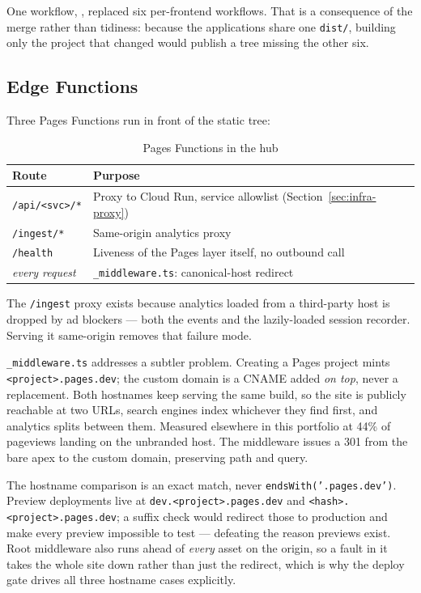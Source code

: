 One workflow, , replaced six per-frontend workflows.
That is a consequence of the merge rather than tidiness: because the applications
share one \texttt{dist/}, building only the project that changed would publish a
tree missing the other six.

\subsection{Edge Functions}

Three Pages Functions run in front of the static tree:

\begin{table}[h]
\centering
\caption{Pages Functions in the hub}
\label{tab:hub-functions}
\begin{tabular}{ll}
\toprule
\textbf{Route} & \textbf{Purpose} \\
\midrule
\texttt{/api/<svc>/*} & Proxy to Cloud Run, service allowlist (Section~\ref{sec:infra-proxy}) \\
\texttt{/ingest/*}    & Same-origin analytics proxy \\
\texttt{/health}      & Liveness of the Pages layer itself, no outbound call \\
\midrule
\emph{every request} & \texttt{\_middleware.ts}: canonical-host redirect \\
\bottomrule
\end{tabular}
\end{table}

The \texttt{/ingest} proxy exists because analytics loaded from a third-party
host is dropped by ad blockers --- both the events and the lazily-loaded session
recorder. Serving it same-origin removes that failure mode.

\texttt{\_middleware.ts} addresses a subtler problem. Creating a Pages project
mints \texttt{<project>.pages.dev}; the custom domain is a CNAME added
\emph{on top}, never a replacement. Both hostnames keep serving the same build,
so the site is publicly reachable at two URLs, search engines index whichever
they find first, and analytics splits between them. Measured elsewhere in this
portfolio at 44\% of pageviews landing on the unbranded host. The middleware
issues a 301 from the bare apex to the custom domain, preserving path and query.

\begin{keyinsight}
The hostname comparison is an exact match, never
\texttt{endsWith('.pages.dev')}. Preview deployments live at
\texttt{dev.<project>.pages.dev} and \texttt{<hash>.<project>.pages.dev}; a
suffix check would redirect those to production and make every preview
impossible to test --- defeating the reason previews exist. Root middleware also
runs ahead of \emph{every} asset on the origin, so a fault in it takes the whole
site down rather than just the redirect, which is why the deploy gate drives all
three hostname cases explicitly.
\end{keyinsight}

